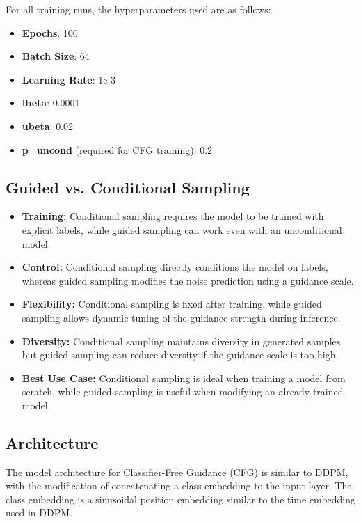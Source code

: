 \documentclass[11pt]{article}
\begin{document}
For all training runs, the hyperparameters used are as follows:
\begin{itemize}
    \item \textbf{Epochs}: 100
    \item \textbf{Batch Size}: 64
    \item \textbf{Learning Rate}: 1e-3
    \item \textbf{lbeta}: 0.0001
    \item \textbf{ubeta}: 0.02
    \item \textbf{p\_uncond} (required for CFG training): 0.2
\end{itemize}

\subsection{Guided vs. Conditional Sampling}

\begin{itemize}
    \item \textbf{Training:} Conditional sampling requires the model to be trained with explicit labels, while guided sampling can work even with an unconditional model.
    
    \item \textbf{Control:} Conditional sampling directly conditions the model on labels, whereas guided sampling modifies the noise prediction using a guidance scale.
    
    \item \textbf{Flexibility:} Conditional sampling is fixed after training, while guided sampling allows dynamic tuning of the guidance strength during inference.
    
    \item \textbf{Diversity:} Conditional sampling maintains diversity in generated samples, but guided sampling can reduce diversity if the guidance scale is too high.
    
    \item \textbf{Best Use Case:} Conditional sampling is ideal when training a model from scratch, while guided sampling is useful when modifying an already trained model.
\end{itemize}

\subsection{Architecture}

The model architecture for Classifier-Free Guidance (CFG) is similar to DDPM, with the modification of concatenating a class embedding to the input layer. The class embedding is a sinusoidal position embedding similar to the time embedding used in DDPM.
\end{document}
